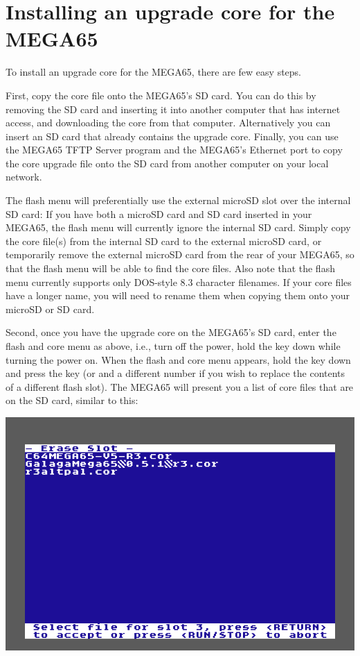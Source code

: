 \section{Installing an upgrade core for the MEGA65}

To install an upgrade core for the MEGA65, there are few easy steps.

First, copy the core file onto the MEGA65's SD card.  You can do this by removing the SD card and inserting
it into another computer that has internet access, and downloading the core from that computer. Alternatively
you can insert an SD card that already contains the upgrade core. Finally, you can use the MEGA65 TFTP Server
program and the MEGA65's Ethernet port to copy the core upgrade file onto the SD card from another computer
on your local network.

The flash menu will preferentially use the external microSD slot over
the internal SD card: If you have both a microSD card and SD card
inserted in your MEGA65, the flash menu will currently ignore the
internal SD card.  Simply copy the core file(s) from the internal SD
card to the external microSD card, or temporarily remove the external
microSD card from the rear of your MEGA65, so that the flash menu will
be able to find the core files.  Also note that the flash menu
currently supports only DOS-style 8.3 character filenames. If your
core files have a longer name, you will need to rename them when
copying them onto your microSD or SD card.

Second, once you have the upgrade core on the MEGA65's SD card, enter the flash and core menu as above,
i.e., turn off the power, hold the  key down while turning the power on.  When the flash
and core menu appears, hold the  key down and press the
 key (or  and a different number if you wish to replace the
contents of a different flash slot).  The MEGA65
will present you a list of core files that are on the SD card, similar
to this:

\includegraphics[width=\linewidth]{images/ss-flashmenu-selectcore.png}

